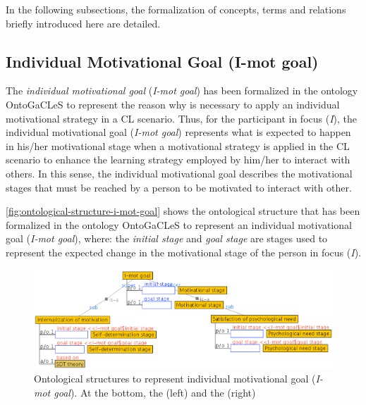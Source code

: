 In the following subsections, the formalization of concepts, terms and relations briefly introduced here are detailed.

\subsection{Individual Motivational Goal (I-mot goal)}
\label{subsec:individual-motivational-goal}

The \emph{individual motivational goal} (\emph{I-mot goal}) has been formalized in the ontology OntoGaCLeS to represent the reason why is necessary to apply an individual motivational strategy in a CL scenario. Thus, for the participant in focus (\emph{I}), the individual motivational goal (\emph{I-mot goal}) represents what is expected to happen in his/her motivational stage when a motivational strategy is applied in the CL scenario to enhance the learning strategy employed by him/her to interact with others. In this sense, the individual motivational goal describes the motivational stages that must be reached by a person to be motivated to interact with other.

\autoref{fig:ontological-structure-i-mot-goal} shows the ontological structure that has been formalized in the ontology OntoGaCLeS to represent an individual motivational goal (\emph{I-mot goal}), where: the \emph{initial stage} and \emph{goal stage} are stages used to represent the expected change in the motivational stage of the person in focus (\emph{I}).

\begin{figure}[!htbp]
 \caption[Ontological structures to represent individual motivational goal (I-mot goal)]{Ontological structures to represent individual motivational goal (\emph{I-mot goal}). At the bottom, the  (left) and the  (right)}
 \label{fig:ontological-structure-i-mot-goal}
 \centering
 \includegraphics[width=1\textwidth]{images/chap-ontogacles1/ontological-structure-i-mot-goal.png}
 \fautor
\end{figure}

